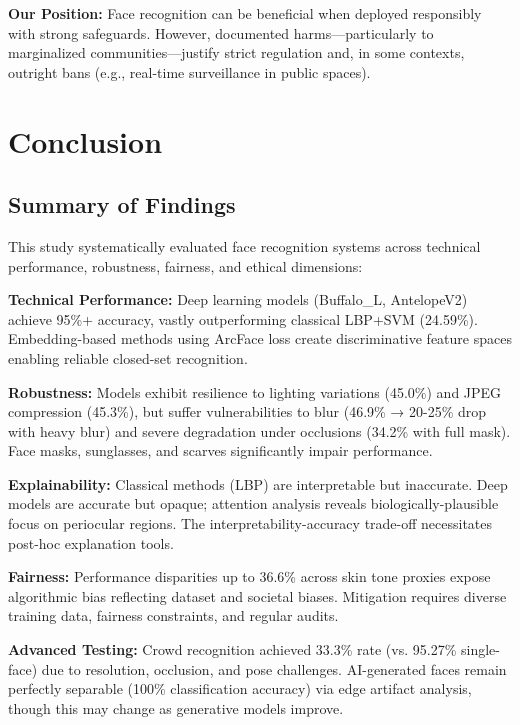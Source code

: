 \documentclass[11pt,a4paper]{article}
\begin{document}
\textbf{Our Position:} Face recognition can be beneficial when deployed responsibly with strong safeguards. However, documented harms—particularly to marginalized communities—justify strict regulation and, in some contexts, outright bans (e.g., real-time surveillance in public spaces).

\section{Conclusion}

\subsection{Summary of Findings}

This study systematically evaluated face recognition systems across technical performance, robustness, fairness, and ethical dimensions:

\textbf{Technical Performance:} Deep learning models (Buffalo\_L, AntelopeV2) achieve 95\%+ accuracy, vastly outperforming classical LBP+SVM (24.59\%). Embedding-based methods using ArcFace loss create discriminative feature spaces enabling reliable closed-set recognition.

\textbf{Robustness:} Models exhibit resilience to lighting variations (45.0\%) and JPEG compression (45.3\%), but suffer vulnerabilities to blur (46.9\% → 20-25\% drop with heavy blur) and severe degradation under occlusions (34.2\% with full mask). Face masks, sunglasses, and scarves significantly impair performance.

\textbf{Explainability:} Classical methods (LBP) are interpretable but inaccurate. Deep models are accurate but opaque; attention analysis reveals biologically-plausible focus on periocular regions. The interpretability-accuracy trade-off necessitates post-hoc explanation tools.

\textbf{Fairness:} Performance disparities up to 36.6\% across skin tone proxies expose algorithmic bias reflecting dataset and societal biases. Mitigation requires diverse training data, fairness constraints, and regular audits.

\textbf{Advanced Testing:} Crowd recognition achieved 33.3\% rate (vs. 95.27\% single-face) due to resolution, occlusion, and pose challenges. AI-generated faces remain perfectly separable (100\% classification accuracy) via edge artifact analysis, though this may change as generative models improve.
\end{document}
